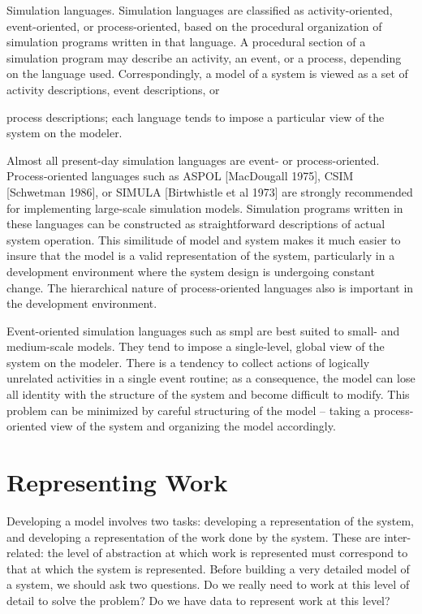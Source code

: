 Simulation languages. Simulation languages are classified as activity-oriented,
event-oriented, or process-oriented, based on the procedural organization of
simulation programs written in that language. A procedural section of a
simulation program may describe an activity, an event, or a process, depending
on the language used. Correspondingly, a model of a system is viewed as a set
of activity descriptions, event descriptions, or

\noindent process descriptions; each language tends to impose a particular view of the
system on the modeler.

Almost all present-day simulation languages are event- or process-oriented.
Process-oriented languages such as ASPOL [MacDougall 1975], CSIM [Schwetman
1986], or SIMULA [Birtwhistle et al 1973] are strongly recommended for
implementing large-scale simulation models. Simulation programs written in
these languages can be constructed as straightforward descriptions of actual
system operation. This similitude of model and system makes it much easier to
insure that the model is a valid representation of the system, particularly in
a development environment where the system design is undergoing constant
change. The hierarchical nature of process-oriented languages also is
important in the development environment.

Event-oriented simulation languages such as smpl are best suited to small- and
medium-scale models. They tend to impose a single-level, global view of the
system on the modeler. There is a tendency to collect actions of logically
unrelated activities in a single event routine; as a consequence, the model can
lose all identity with the structure of the system and become difficult to
modify. This problem can be minimized by careful structuring of the model --
taking a process-oriented view of the system and organizing the model
accordingly.

\section{Representing Work}
\label{sec:representing-work}

Developing a model involves two tasks: developing a representation of the
system, and developing a representation of the work done by the system. These
are inter-related: the level of abstraction at which work is represented must
correspond to that at which the system is represented. Before building a very
detailed model of a system, we should ask two questions. Do we really need to
work at this level of detail to solve the problem? Do we have data to represent
work at this level?

